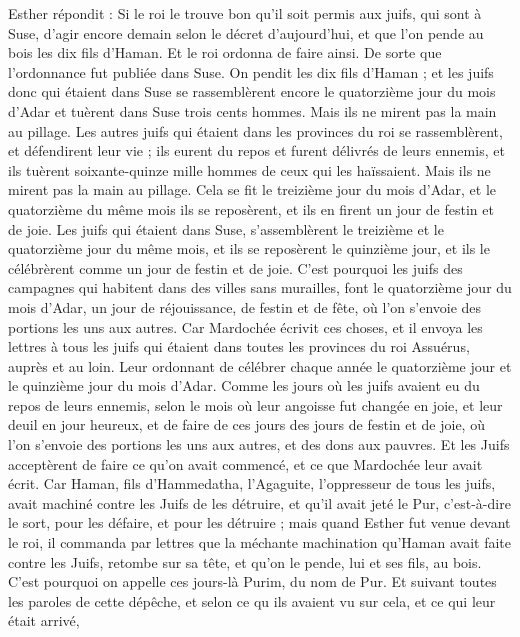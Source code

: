 \begin{multicols}{2}
Esther répondit : Si le roi le trouve bon qu'il soit permis aux juifs, qui sont à Suse, d’agir encore demain selon le décret d’aujourd'hui, et que l'on pende au bois les dix fils d'Haman.
Et le roi ordonna de faire ainsi. De sorte que l’ordonnance fut publiée dans Suse. On pendit les dix fils d'Haman ;
et les juifs donc qui étaient dans Suse se rassemblèrent encore le quatorzième jour du mois d'Adar et tuèrent dans Suse trois cents hommes. Mais ils ne mirent pas la main au pillage.
Les autres juifs qui étaient dans les provinces du roi se rassemblèrent, et défendirent leur vie ; ils eurent du repos et furent délivrés de leurs ennemis, et ils tuèrent soixante-quinze mille hommes de ceux qui les haïssaient. Mais ils ne mirent pas la main au pillage.
Cela se fit le treizième jour du mois d'Adar, et le quatorzième du même mois ils se reposèrent, et ils en firent un jour de festin et de joie.
Les juifs qui étaient dans Suse, s'assemblèrent le treizième et le quatorzième jour du même mois, et ils se reposèrent le quinzième jour, et ils le célébrèrent comme un jour de festin et de joie.
C'est pourquoi les juifs des campagnes qui habitent dans des villes sans murailles, font le quatorzième jour du mois d'Adar, un jour de réjouissance, de festin et de fête, où l’on s’envoie des portions les uns aux autres.
Car Mardochée écrivit ces choses, et il envoya les lettres à tous les juifs qui étaient dans toutes les provinces du roi Assuérus, auprès et au loin.
Leur ordonnant de célébrer chaque année le quatorzième jour et le quinzième jour du mois d'Adar.
Comme les jours où les juifs avaient eu du repos de leurs ennemis, selon le mois où leur angoisse fut changée en joie, et leur deuil en jour heureux, et de faire de ces jours des jours de festin et de joie, où l’on s’envoie des portions les uns aux autres, et des dons aux pauvres.
Et les Juifs acceptèrent de faire ce qu’on avait commencé, et ce que Mardochée leur avait écrit.
Car Haman, fils d'Hammedatha, l’Agaguite, l'oppresseur de tous les juifs, avait machiné contre les Juifs de les détruire, et qu’il avait jeté le Pur, c’est-à-dire le sort, pour les défaire, et pour les détruire ;
mais quand Esther fut venue devant le roi, il commanda par lettres que la méchante machination qu’Haman avait faite contre les Juifs, retombe sur sa tête, et qu’on le pende, lui et ses fils, au bois.
C'est pourquoi on appelle ces jours-là Purim, du nom de Pur. Et suivant toutes les paroles de cette dépêche, et selon ce qu ils avaient vu sur cela, et ce qui leur était arrivé,

\end{multicols}
